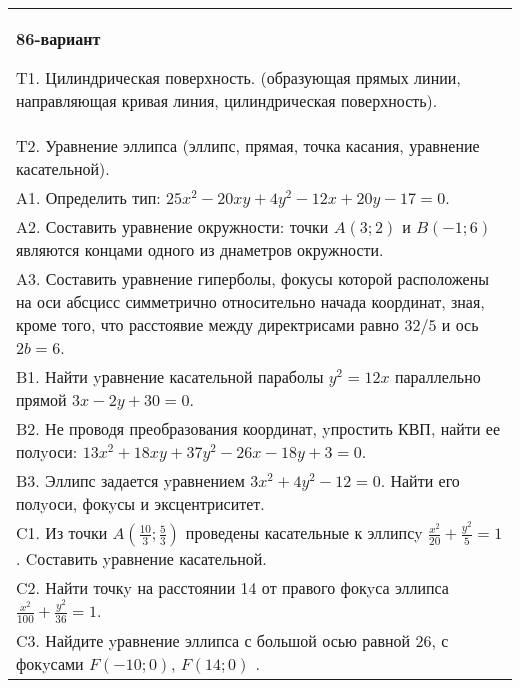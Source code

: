 \documentclass{article}
\begin{document}
\begin{tabular}{m{17cm}}
\textbf{86-вариант}
\newline

T1. Цилиндрическая поверхность. (образующая прямых линии, направляющая кривая линия, цилиндрическая поверхность).\\

T2. Уравнение эллипса (эллипс, прямая, точка касания, уравнение касательной).\\

A1. Определить тип: $25x^{2}-20xy+4y^{2}-12x+20y-17=0$.\\

A2. Составить уравнение окружности: точки $A(3;2)$ и $B(-1;6)$ являются концами одного из днаметров окружности.\\

A3. Составить уравнение гиперболы, фокусы которой расположены на оси абсцисс симметрично относительно начада координат, зная, кроме того, что расстоявие между директрисами равно $32/5$ и ось $2b=6$.\\

B1. Найти yравнение касательной параболы $y^{2} = 12x$ параллельно прямой $3x - 2y + 30 = 0$.  \\

B2. Не проводя преобразования координат, yпростить КВП, найти ее полyоси: $13x^{2} + 18xy + 37y^{2} - 26x - 18y + 3 = 0$.  \\

B3. Эллипс задается yравнением $3x^{2} + 4y^{2} - 12 = 0$. Найти его полyоси, фокyсы и эксцентриситет.  \\

C1. Из точки $A(\frac{10}{3};\frac{5}{3})$ проведены касательные к эллипсy $\frac{x^{2}}{20}+\frac{y^{2}}{5}=1$ . Cоставить yравнение касательной.  \\

C2. Найти точкy на расстоянии 14 от правого фокyса эллипса $\frac{x^{2}}{100}+\frac{y^{2}}{36}=1$.\\

C3. Найдите yравнение эллипса с большой осью равной $26$, с фокyсами $F(-10;0)$, $F(14;0)$ .  \\

\end{tabular}
\vspace{1cm}
\end{document}
